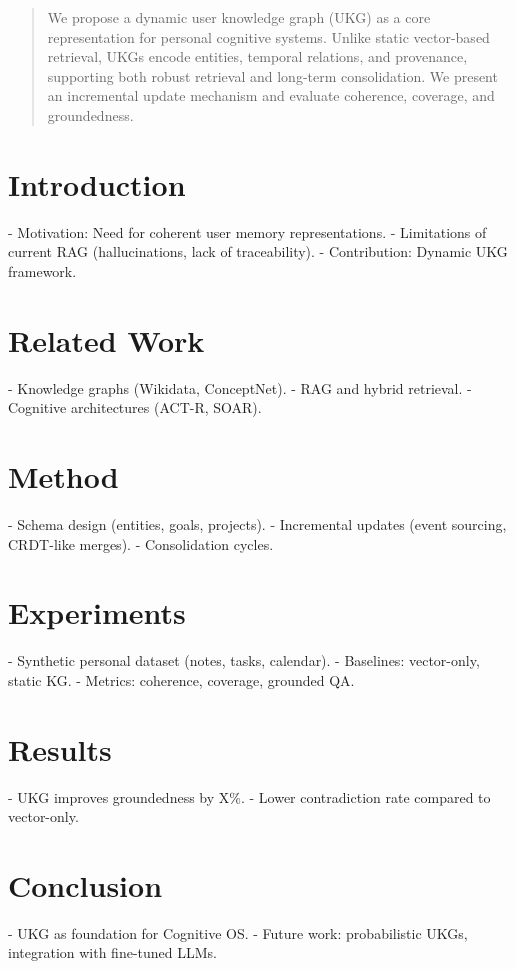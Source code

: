 \documentclass{article}
\author{
	Gustave Vernay \\
	Avisia / Aivancity / École Polytechnique (candidate PhD) \\
		exttt{gustave.vernay@example.com} \\
}
\begin{document}
\maketitle

\begin{abstract}
We propose a dynamic user knowledge graph (UKG) as a core representation 
for personal cognitive systems. Unlike static vector-based retrieval, UKGs 
encode entities, temporal relations, and provenance, supporting both robust 
retrieval and long-term consolidation. We present an incremental update 
mechanism and evaluate coherence, coverage, and groundedness.
\end{abstract}

\section{Introduction}
- Motivation: Need for coherent user memory representations.  
- Limitations of current RAG (hallucinations, lack of traceability).  
- Contribution: Dynamic UKG framework.  

\section{Related Work}
- Knowledge graphs (Wikidata, ConceptNet).  
- RAG and hybrid retrieval.  
- Cognitive architectures (ACT-R, SOAR).  

\section{Method}
- Schema design (entities, goals, projects).  
- Incremental updates (event sourcing, CRDT-like merges).  
- Consolidation cycles.  

\section{Experiments}
- Synthetic personal dataset (notes, tasks, calendar).  
- Baselines: vector-only, static KG.  
- Metrics: coherence, coverage, grounded QA.  

\section{Results}
- UKG improves groundedness by X\%.  
- Lower contradiction rate compared to vector-only.  

\section{Conclusion}
- UKG as foundation for Cognitive OS.  
- Future work: probabilistic UKGs, integration with fine-tuned LLMs.  



\end{document}
